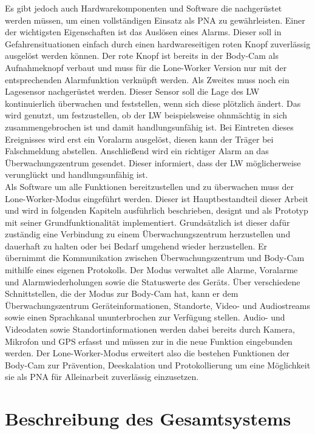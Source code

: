 \documentclass[thesis.tex]{subfiles}
\begin{document}
Es gibt jedoch auch Hardwarekomponenten und Software die nachgerüstet werden müssen, um einen vollständigen Einsatz als PNA zu gewährleisten.
Einer der wichtigsten Eigenschaften ist das Auslösen eines Alarms.
Dieser soll in Gefahrensituationen einfach durch einen hardwareseitigen roten Knopf zuverlässig ausgelöst werden können.
Der rote Knopf ist bereits in der Body-Cam als Aufnahmeknopf verbaut und muss für die Lone-Worker Version nur mit der entsprechenden Alarmfunktion verknüpft werden.
Als Zweites muss noch ein Lagesensor nachgerüstet werden.
Dieser Sensor soll die Lage des LW kontinuierlich überwachen und feststellen, wenn sich diese plötzlich ändert.
Das wird genutzt, um festzustellen, ob der LW beispielsweise ohnmächtig in sich zusammengebrochen ist und damit handlungsunfähig ist.
Bei Eintreten dieses Ereignisses wird erst ein Voralarm ausgelöst, diesen kann der Träger bei Falschmeldung abstellen.
Anschließend wird ein richtiger Alarm an das Überwachungszentrum gesendet.
Dieser informiert, dass der LW möglicherweise verunglückt und handlungsunfähig ist.
\\

Als Software um alle Funktionen bereitzustellen und zu überwachen muss der Lone-Worker-Modus eingeführt werden.
Dieser ist Hauptbestandteil dieser Arbeit und wird in folgenden Kapiteln ausführlich beschrieben, designt und als Prototyp mit seiner Grundfunktionalität  implementiert.
Grundsätzlich ist dieser dafür zuständig eine Verbindung zu einem Überwachungszentrum herzustellen und dauerhaft zu halten oder bei Bedarf umgehend wieder herzustellen.
Er übernimmt die Kommunikation zwischen Überwachungszentrum und Body-Cam mithilfe eines eigenen Protokolls.
Der Modus verwaltet alle Alarme, Voralarme und Alarmwiederholungen sowie die Statuswerte des Geräts.
Über verschiedene Schnittstellen, die der Modus zur Body-Cam hat, kann er dem Überwachungszentrum Geräteinformationen, Standorte, Video- und Audiostreams sowie einen Sprachkanal ununterbrochen zur Verfügung stellen.
Audio- und Videodaten sowie Standortinformationen werden dabei bereits durch Kamera, Mikrofon und GPS erfasst und müssen zur in die neue Funktion eingebunden werden.
Der Lone-Worker-Modus erweitert also die bestehen Funktionen der Body-Cam zur Prävention, Deeskalation und Protokollierung um eine Möglichkeit sie als PNA für Alleinarbeit zuverlässig einzusetzen.
\\

\section{Beschreibung des Gesamtsystems}
\end{document}
